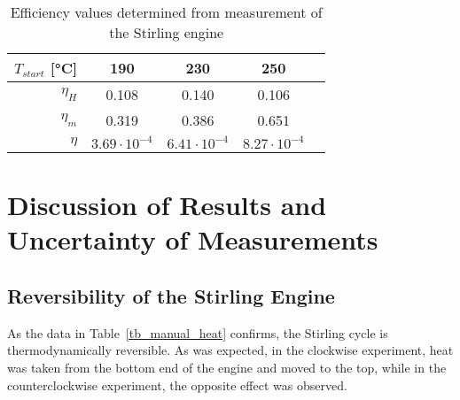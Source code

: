 \documentclass[titlepage]{article}
\begin{document}
\begin{table}[H]
    \centering
    \caption{Efficiency values determined from measurement of the Stirling engine}
    \label{tb_efficiency_values}
    \begin{tabular}{|r||c|c|c|c|}
        \hline
        \(T_{start}\) [°C] & \textbf{190} & \textbf{230} & \textbf{250}
        \\
        \hline
        \hline
        \(\eta_H\) & 0.108 & 0.140 & 0.106
        \\
        \hline
        \(\eta_m\) & 0.319 & 0.386 & 0.651
        \\
        \hline
        \(\eta\) & \(3.69 \cdot 10^{-4}\) & \(6.41 \cdot 10^{-4}\) & \(8.27 \cdot 10^{-4}\)
        \\
        \hline
    \end{tabular}
\end{table}

\newpage
\section{Discussion of Results and Uncertainty of Measurements}
\subsection{Reversibility of the Stirling Engine}
As the data in Table~\ref{tb_manual_heat} confirms, the Stirling cycle is thermodynamically reversible. As was expected, in the clockwise experiment, heat was taken from the bottom end of the engine and moved to the top, while in the counterclockwise experiment, the opposite effect was observed.
\end{document}
